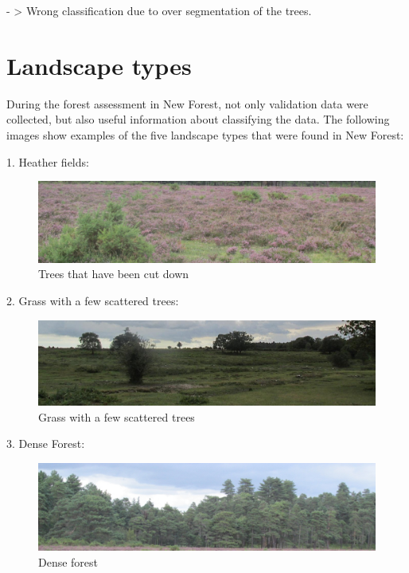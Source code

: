 \documentclass{subfiles}
\begin{document}
	   - > Wrong classification due to over segmentation of the trees. 
   \newpage
\section{	Landscape types}
	During the forest assessment in New Forest, not only validation data were collected, but also useful information about classifying the data. The following images show examples of the five landscape types that were found in New Forest:
	
	1.	Heather fields:
    
      \begin{figure} [!h]
      	\centering
      	\includegraphics[width=\textwidth]{img/NewForest/LT_HeatherFields}
      	\caption{Trees that have been cut down}
      	\label{fig:LT_HeatherFields}
      \end{figure}

    
    2.	Grass with a few scattered trees:
          \begin{figure} [!h]
          	\centering
          	\includegraphics[width=\textwidth]{img/NewForest/LT_GrassWithFewTrees}
          	\caption{Grass with a few scattered trees}
          	\label{fig:LT_GrassWithFewTrees}
          \end{figure}

    3.	Dense Forest:
          \begin{figure} [!h]
          	\centering
          	\includegraphics[width=\textwidth]{img/NewForest/LT_DenseForest}
          	\caption{Dense forest}
          	\label{fig:LT_DenseForest}
          \end{figure}
          
\end{document}
